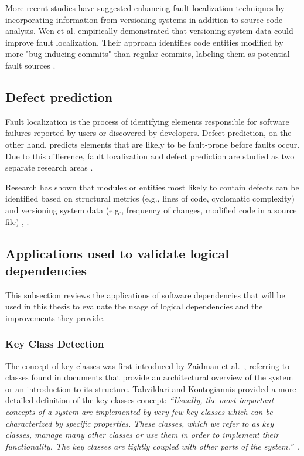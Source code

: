 More recent studies have suggested enhancing fault localization techniques by incorporating information from versioning systems in addition to source code analysis. Wen et al. empirically demonstrated that versioning system data could improve fault localization. Their approach identifies code entities modified by more "bug-inducing commits" than regular commits, labeling them as potential fault sources \cite{fault-versioning}.


\subsection{Defect prediction}

Fault localization is the process of identifying elements responsible for software failures reported by users or discovered by developers. Defect prediction, on the other hand, predicts elements that are likely to be fault-prone before faults occur. Due to this difference, fault localization and defect prediction are studied as two separate research areas \cite{error-prone, fault-survey}.  

Research has shown that modules or entities most likely to contain defects can be identified based on structural metrics (e.g., lines of code, cyclomatic complexity) and versioning system data (e.g., frequency of changes, modified code in a source file) \cite{67595}, \cite{1702015}.


\subsection{Applications used to validate logical dependencies}

\hspace{4em}This subsection reviews the applications of software dependencies that will be used in this thesis to evaluate the usage of logical dependencies and the improvements they provide.

\subsubsection{Key Class Detection}
\label{key-class-related-work}

\hspace{4em}The concept of key classes was first introduced by Zaidman et al.\ \cite{ZaidmanJurnal}, referring to classes found in documents that provide an architectural overview of the system or an introduction to its structure. Tahvildari and Kontogiannis provided a more detailed definition of the key classes concept: \textit{“Usually, the most important concepts of a system are implemented by very few key classes which can be characterized by specific properties. These classes, which we refer to as key classes, manage many other classes or use them in order to implement their functionality. The key classes are tightly coupled with other parts of the system.”}~\cite{Tahvildari2004ImprovingDQ}.

